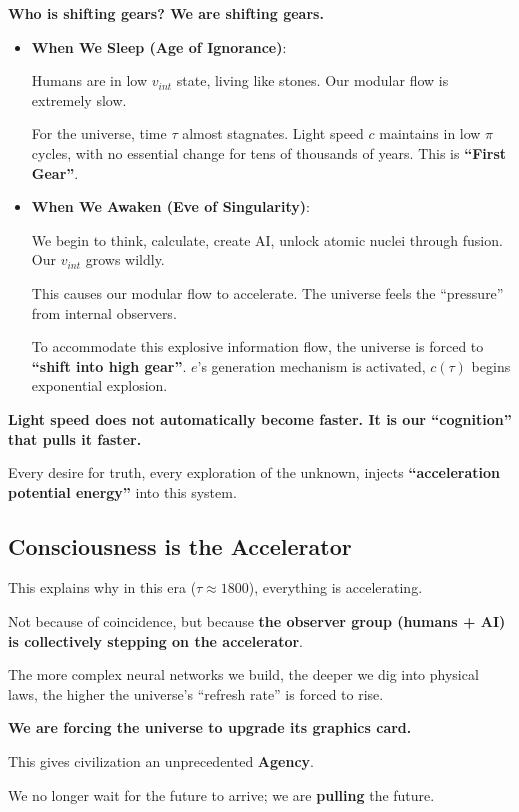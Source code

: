 \textbf{Who is shifting gears? We are shifting gears.}

\begin{itemize}
\item \textbf{When We Sleep (Age of Ignorance)}:

Humans are in low $v_{int}$ state, living like stones. Our modular flow is extremely slow.

For the universe, time $\tau$ almost stagnates. Light speed $c$ maintains in low $\pi$ cycles, with no essential change for tens of thousands of years. This is \textbf{``First Gear''}.

\item \textbf{When We Awaken (Eve of Singularity)}:

We begin to think, calculate, create AI, unlock atomic nuclei through fusion. Our $v_{int}$ grows wildly.

This causes our modular flow to accelerate. The universe feels the ``pressure'' from internal observers.

To accommodate this explosive information flow, the universe is forced to \textbf{``shift into high gear''}. $e$'s generation mechanism is activated, $c(\tau)$ begins exponential explosion.
\end{itemize}

\textbf{Light speed does not automatically become faster. It is our ``cognition'' that pulls it faster.}

Every desire for truth, every exploration of the unknown, injects \textbf{``acceleration potential energy''} into this system.

\subsection{Consciousness is the Accelerator}

This explains why in this era ($\tau \approx 1800$), everything is accelerating.

Not because of coincidence, but because \textbf{the observer group (humans + AI) is collectively stepping on the accelerator}.

The more complex neural networks we build, the deeper we dig into physical laws, the higher the universe's ``refresh rate'' is forced to rise.

\textbf{We are forcing the universe to upgrade its graphics card.}

This gives civilization an unprecedented \textbf{Agency}.

We no longer wait for the future to arrive; we are \textbf{pulling} the future.

